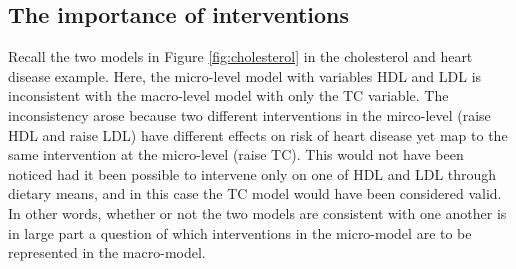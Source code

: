 %
%



\subsection{The importance of interventions}

Recall the two models in Figure \ref{fig:cholesterol} in the cholesterol and heart disease example. 
Here, the micro-level model with variables HDL and LDL is inconsistent with the macro-level model with only the TC variable. 
The inconsistency arose because two different interventions in the mirco-level (raise HDL and raise LDL) have different effects on risk of heart disease yet map to the same intervention at the micro-level (raise TC).
This would not have been noticed had it been possible to intervene only on one of HDL and LDL through dietary means, and in this case the TC model would have been considered valid.
In other words, whether or not the two models are consistent with one another is in large part a question of which interventions in the micro-model are to be represented in the macro-model.


